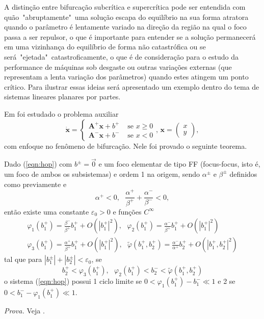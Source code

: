 A distinção entre bifurcação subcrítica e supercrítica pode ser entendida com quão~"abruptamente"~uma solução escapa do equilíbrio na sua forma atratora quando o parâmetro é lentamente variado na direção da região na qual o foco passa a ser repulsor, o que é importante para entender se a solução permanecerá em uma vizinhança do equilíbrio de forma não catastrófica ou se será~"ejetada"~catastroficamente, o que é de consideração para o estudo da performance de máquinas sob desgaste ou outras variações externas (que representam a lenta variação dos parâmetros) quando estes atingem um ponto crítico. Para ilustrar essas ideias será apresentado um exemplo dentro do tema de sistemas lineares planares por partes.

Em \cite{HAN20102399} foi estudado o problema auxiliar
\begin{equation}
\label{eqn:hop}
\dot{\mathbf{x}}=\left\{\begin{array}{ll}
\mathbf{A}^{+}\mathbf{x}+b^+  & \text { se } x \geq 0 \\
\mathbf{A}^{-}\mathbf{x}+b^-  & \text { se } x<0
\end{array}
\text{, }\mathbf{x}=
\begin{pmatrix}
x\\
y
\end{pmatrix}
\right.,
\end{equation}
com enfoque no fenômeno de bifurcação. Nele foi provado o seguinte teorema.
\begin{theorem} Dado (\ref{eqn:hop}) com $b^\pm=\vec{0}$ e um foco elementar de tipo FF (focus-focus, isto é, um foco de ambos os  subsistemas) e ordem 1 na origem, sendo $\alpha^\pm$ e $\beta^\pm$ definidos como previamente e
\[
\alpha^+<0,\text{ } \frac{\alpha^+}{\beta^+}+\frac{\alpha^-}{\beta^-} < 0,
\]
então existe uma constante $\varepsilon_{0}>0$ e funções $C^{\infty}$
$$
\begin{gathered}
\varphi_{1}\left(b_{1}^{+}\right)=\frac{\beta^{-}}{\beta^{+}} b_{1}^{+}+O\left(\left|b_{1}^{+}\right|^{2}\right), \text{ } \varphi_{2}\left(b_{1}^{+}\right)=\frac{\alpha^{-}}{\beta^{+}} b_{1}^{+}+O\left(\left|b_{1}^{+}\right|^{2}\right) \\
\varphi_{3}\left(b_{1}^{+}\right)=\frac{\alpha^{+}}{\beta^{+}} b_{1}^{+}+O\left(\left|b_{1}^{+}\right|^{2}\right), \text{ } \tilde{\varphi}\left(b_{1}^{+}, b_{2}^{+}\right)=\frac{\alpha^{-}}{\alpha^{+}} b_{2}^{+}+O\left(\left|b_{1}^{+}, b_{2}^{+}\right|^{2}\right)
\end{gathered}
$$
tal que para $\left|b_{1}^{\pm}\right|+\left|b_{2}^{\pm}\right|<\varepsilon_{0}$, se
$$
b_{2}^{+}<\varphi_{3}\left(b_{1}^{+}\right),\text{ }  \varphi_{2}\left(b_{1}^{+}\right)<b_{2}^{-}<\tilde{\varphi}\left(b_{1}^{+}, b_{2}^{+}\right)
$$
o sistema (\ref{eqn:hop}) possui 1 ciclo limite se $0<\varphi_{1}\left(b_{1}^{+}\right)-b_{1}^{-}\ll 1$ e 2 se $0<b_{1}^{-}-\varphi_{1}\left(b_{1}^{+}\right) \ll 1$.
\end{theorem}
\textit{Prova.} Veja \cite{HAN20102399}.

